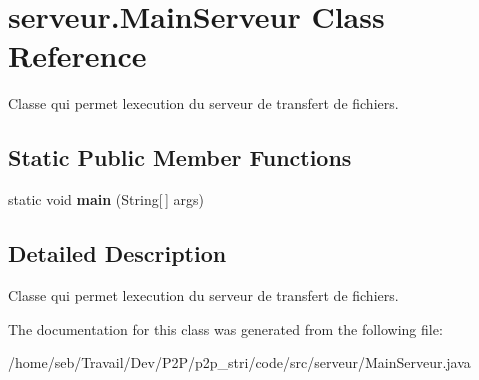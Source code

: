 \hypertarget{classserveur_1_1MainServeur}{}\section{serveur.\+Main\+Serveur Class Reference}
\label{classserveur_1_1MainServeur}


Classe qui permet l\textquotesingle{}execution du serveur de transfert de fichiers.  


\subsection*{Static Public Member Functions}
\begin{DoxyCompactItemize}
\item 
\mbox{\label{classserveur_1_1MainServeur_afe17c1452f1eaafbe93c797ff10bc824}} 
static void {\bfseries main} (String\mbox{[}$\,$\mbox{]} args)
\end{DoxyCompactItemize}


\subsection{Detailed Description}
Classe qui permet l\textquotesingle{}execution du serveur de transfert de fichiers. 

The documentation for this class was generated from the following file\+:\begin{DoxyCompactItemize}
\item 
/home/seb/\+Travail/\+Dev/\+P2\+P/p2p\+\_\+stri/code/src/serveur/Main\+Serveur.\+java\end{DoxyCompactItemize}
